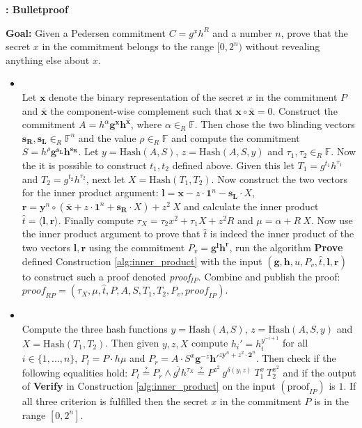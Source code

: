 \begin{algorithm}[]
\caption{\textbf{: Bulletproof}}
\textbf{Goal:}  Given a Pedersen commitment $C=g^x h^R$ and a number $n$, prove that the secret $x$ in the commitment belongs to the range  $[0,2^n)$ without revealing anything else about $x$.
\vspace{2pt}
\hline
\vspace{2pt}
\begin{itemize}
\item{}\\
Let $\bm{x}$ denote the binary representation of the secret $x$ in the commitment $P$ and $\bar{\bm{x}}$ the component-wise complement such  that $\bm{x}\circ \bar{\bm{x}} = 0$. Construct the commitment $A= h^{\alpha} \bm{g}^{ \bm{x} } \bm{h}^{ \bar{\bm{x}} }$, where $\alpha \in_R \mathds{F}$. Then chose the two blinding vectors $\bm{s_R},\bm{s_L}\in_R\mathds{F}^n$ and the value $\rho\in_R\mathds{F}$ and compute the commitment $S=h^{\rho} \bm{g}^{\bm{s_L}} \bm{h}^{\bm{s_R}}$. Let $y=\text{Hash}(A,S)$, $z=\text{Hash}(A,S,y)$ and $\tau_1,\tau_2\in_R\mathds{F}$. Now the it is possible to construct $t_1,t_2$ defined above. Given this let $T_1=g^{t_1}h^{\tau_1}$ and $T_2=g^{t_2}h^{\tau_2}$, next let $X=\text{Hash}(T_1,T_2)$. Now construct the two vectors for the inner product argument: $\bm{l} = \bm{x}-z\cdot \bm{1}^n-\bm{s_L}\cdot X$, $\bm{r}= \bm{y}^n\circ(\bar{\bm{x}}+ z\cdot \bm{1}^n+\bm{s_R}\cdot X ) + z^2\ X $ and calculate the inner product $\hat{t} = \langle \bm{l},\bm{r}\rangle$. Finally compute $\tau_X = \tau_2 x^2 + \tau_1 X + z^2 R$ and $\mu = \alpha+ R\:X$.  Now use the inner product argument to prove that $\hat{t}$ is indeed the inner product of the two vectors $\mathbf{l},\mathbf{r}$ using the commitment $P_v = \bm{g}^{\bm{l}}\bm{h}^{\bm{r}}$, run the algorithm  \textbf{Prove}  defined Construction \ref{alg:inner_product} with the input $(\bm{g},\bm{h},u,P_v,\hat{t},\bm{l},\bm{r})$ to construct such a proof denoted  \textit{proof$_{IP}$}. Combine and publish  the proof: $\textit{proof}_{RP} = (\tau_X, \mu , \hat{t}, P, A, S, T_1, T_2 , P_v ,\textit{proof}_{IP}) $.

\item{}\\
Compute the three hash functions $y= \text{Hash}(A,S)$, $z= \text{Hash}(A,S,y)$ and $X= \text{Hash}(T_1,T_2)$. Then given  $y,z,X$ compute $h_i' = h_i ^{y^{-i+1}}$ for all $i\in\{1,...,n\}$, $P_l = P\cdot h\mu$ and $P_r = A\cdot S ^x \bm{g}^ {-z}\bm{h'}^{z\bm{y}^n+z^2\cdot \bm{2}^n}$. Then check if the following equalities hold: $P_l\overset{?}{=} P_r \wedge g^{\hat{t}}h^{\tau_X} \overset{?}{=}  P ^{z^2}\:g^{\delta(y,z)}\:T_1^x\:T_2^{x^2}$ and if the output of \textbf{Verify} in Construction \ref{alg:inner_product} on the input $(\text{proof}_{IP})$ is $1$. If all three criterion is fulfilled then the secret  $x$ in the commitment $P$ is in the range $[0,2^n]$.
\end{itemize}
\label{alg:bullet}
\end{algorithm}

